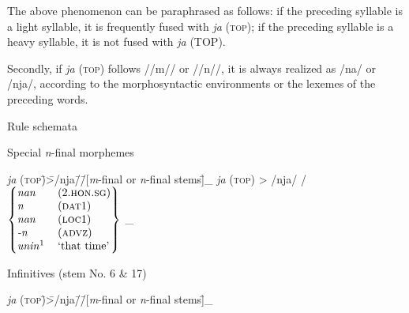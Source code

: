 The above phenomenon can be paraphrased as follows: if the preceding syllable is a light syllable, it is frequently fused with \textit{ja} (\textsc{top}); if the preceding syllable is a heavy syllable, it is not fused with \textit{ja} (TOP).

  Secondly, if \textit{ja} (\textsc{top}) follows //m// or //n//, it is always realized as /na/ or /nja/, according to the morphosyntactic environments or the lexemes of the preceding words.

\begin{exe}
\ex Rule schemata\label{ex:10.3}
  \begin{xlist}
  \ex  Special \textit{n}{}-final morphemes
    \begin{tabbing}
    \textit{ja} (\textsc{top})\hspace{\tabcolsep}\=\hspace{\tabcolsep}>\hspace{\tabcolsep}\=\hspace{\tabcolsep}/nja/\hspace{\tabcolsep}\=\hspace{\tabcolsep}/\hspace{\tabcolsep}\=\hspace{\tabcolsep}[\textit{m}{}-final or \textit{n}{}-final stems]\hspace{\tabcolsep}\=\hspace{\tabcolsep}\_\kill
    \textit{ja} (\textsc{top}) \> > \> /nja/ \> / \> $\left\{\begin{tabular}{@{}ll@{}}
                                             \textit{nan}                  & (2.\textsc{hon}.\textsc{sg})\\
                                             \textit{n}                    & (\textsc{dat}1)\\
                                             \textit{nan}                  & (\textsc{loc}1)\\
                                             \textit{{}-n}                 & (\textsc{advz})\\
                                             \textit{unin}\footnotemark{}  & ‘that time’\\
                                             \end{tabular}\right\}$ \> \_\\
    \end{tabbing}
    \ex Infinitives (stem No. 6 \& 17)
    \begin{tabbing}
    \textit{ja} (\textsc{top})\hspace{\tabcolsep}\=\hspace{\tabcolsep}>\hspace{\tabcolsep}\=\hspace{\tabcolsep}/nja/\hspace{\tabcolsep}\=\hspace{\tabcolsep}/\hspace{\tabcolsep}\=\hspace{\tabcolsep}[\textit{m}{}-final or \textit{n}{}-final stems]\hspace{\tabcolsep}\=\hspace{\tabcolsep}\_\kill

\end{tabbing}
\end{xlist}
\end{exe}
